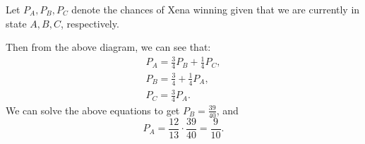 \documentclass[11pt,twoside]{scrartcl}
\begin{document}
\begin{problem}
\begin{sketch}
        Let $P_A, P_B, P_C$ denote the chances of Xena winning given that we are currently in state $A, B, C$, respectively.

        Then from the above diagram, we can see that:
        \begin{align*}
            P_A = \frac{3}{4}P_B + \frac{1}{4}P_C, \\
            P_B = \frac{3}{4} + \frac{1}{4}P_A, \\
            P_C = \frac{3}{4} P_A.
        \end{align*}
        We can solve the above equations to get $P_B = \frac{39}{40}$, and 
        $$P_A = \frac{12}{13}\cdot\frac{39}{40} = \boxed{\frac{9}{10}}.$$
    \end{sketch}
\end{problem}
\end{document}
